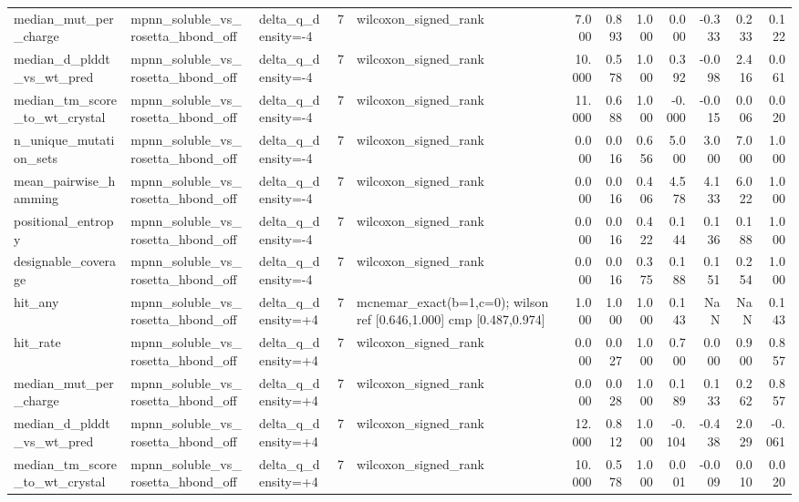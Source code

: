 \begin{table}
{\begin{tabular}{lllrlrrrrrrr}
median\_mut\_per\_charge & mpnn\_soluble\_vs\_rosetta\_hbond\_off & delta\_q\_density=-4 & 7 & wilcoxon\_signed\_rank & 7.000 & 0.893 & 1.000 & 0.000 & -0.333 & 0.233 & 0.122 \\
median\_d\_plddt\_vs\_wt\_pred & mpnn\_soluble\_vs\_rosetta\_hbond\_off & delta\_q\_density=-4 & 7 & wilcoxon\_signed\_rank & 10.000 & 0.578 & 1.000 & 0.392 & -0.098 & 2.416 & 0.061 \\
median\_tm\_score\_to\_wt\_crystal & mpnn\_soluble\_vs\_rosetta\_hbond\_off & delta\_q\_density=-4 & 7 & wilcoxon\_signed\_rank & 11.000 & 0.688 & 1.000 & -0.000 & -0.015 & 0.006 & 0.020 \\
n\_unique\_mutation\_sets & mpnn\_soluble\_vs\_rosetta\_hbond\_off & delta\_q\_density=-4 & 7 & wilcoxon\_signed\_rank & 0.000 & 0.016 & 0.656 & 5.000 & 3.000 & 7.000 & 1.000 \\
mean\_pairwise\_hamming & mpnn\_soluble\_vs\_rosetta\_hbond\_off & delta\_q\_density=-4 & 7 & wilcoxon\_signed\_rank & 0.000 & 0.016 & 0.406 & 4.578 & 4.133 & 6.022 & 1.000 \\
positional\_entropy & mpnn\_soluble\_vs\_rosetta\_hbond\_off & delta\_q\_density=-4 & 7 & wilcoxon\_signed\_rank & 0.000 & 0.016 & 0.422 & 0.144 & 0.136 & 0.188 & 1.000 \\
designable\_coverage & mpnn\_soluble\_vs\_rosetta\_hbond\_off & delta\_q\_density=-4 & 7 & wilcoxon\_signed\_rank & 0.000 & 0.016 & 0.375 & 0.188 & 0.151 & 0.254 & 1.000 \\
hit\_any & mpnn\_soluble\_vs\_rosetta\_hbond\_off & delta\_q\_density=+4 & 7 & mcnemar\_exact(b=1,c=0); wilson ref [0.646,1.000] cmp [0.487,0.974] & 1.000 & 1.000 & 1.000 & 0.143 & NaN & NaN & 0.143 \\
hit\_rate & mpnn\_soluble\_vs\_rosetta\_hbond\_off & delta\_q\_density=+4 & 7 & wilcoxon\_signed\_rank & 0.000 & 0.027 & 1.000 & 0.700 & 0.000 & 0.900 & 0.857 \\
median\_mut\_per\_charge & mpnn\_soluble\_vs\_rosetta\_hbond\_off & delta\_q\_density=+4 & 7 & wilcoxon\_signed\_rank & 0.000 & 0.028 & 1.000 & 0.189 & 0.133 & 0.262 & 0.857 \\
median\_d\_plddt\_vs\_wt\_pred & mpnn\_soluble\_vs\_rosetta\_hbond\_off & delta\_q\_density=+4 & 7 & wilcoxon\_signed\_rank & 12.000 & 0.812 & 1.000 & -0.104 & -0.438 & 2.029 & -0.061 \\
median\_tm\_score\_to\_wt\_crystal & mpnn\_soluble\_vs\_rosetta\_hbond\_off & delta\_q\_density=+4 & 7 & wilcoxon\_signed\_rank & 10.000 & 0.578 & 1.000 & 0.001 & -0.009 & 0.010 & 0.020 \\

\end{tabular}}
\end{table}
